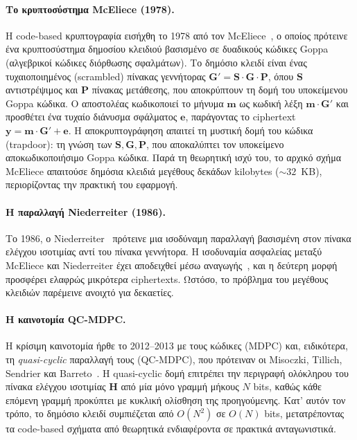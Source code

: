 \paragraph{Το κρυπτοσύστημα McEliece (1978).}
Η code-based κρυπτογραφία εισήχθη το 1978 από τον McEliece~\cite{McEliece1978},
ο οποίος πρότεινε ένα κρυπτοσύστημα δημοσίου κλειδιού βασισμένο σε δυαδικούς
κώδικες Goppa (αλγεβρικοί κώδικες διόρθωσης σφαλμάτων).
Το δημόσιο κλειδί είναι ένας τυχαιοποιημένος (scrambled) πίνακας γεννήτορας
$\mathbf{G}' = \mathbf{S}\cdot\mathbf{G}\cdot\mathbf{P}$, όπου $\mathbf{S}$ αντιστρέψιμος και
$\mathbf{P}$ πίνακας μετάθεσης, που αποκρύπτουν τη δομή του υποκείμενου Goppa κώδικα.
Ο αποστολέας κωδικοποιεί το μήνυμα $\mathbf{m}$ ως κωδική λέξη $\mathbf{m}\cdot\mathbf{G}'$
και προσθέτει ένα τυχαίο διάνυσμα σφάλματος $\mathbf{e}$,
παράγοντας το ciphertext $\mathbf{y} = \mathbf{m}\cdot\mathbf{G}' + \mathbf{e}$.
Η αποκρυπτογράφηση απαιτεί τη μυστική δομή του κώδικα (trapdoor): τη γνώση των $\mathbf{S}, \mathbf{G}, \mathbf{P}$, που αποκαλύπτει τον υποκείμενο αποκωδικοποιήσιμο Goppa κώδικα.
Παρά τη θεωρητική ισχύ του, το αρχικό σχήμα McEliece απαιτούσε δημόσια κλειδιά
μεγέθους δεκάδων kilobytes (${\sim}32$~KB), περιορίζοντας την πρακτική του εφαρμογή.

\paragraph{Η παραλλαγή Niederreiter (1986).}
Το 1986, ο Niederreiter~\cite{Niederreiter1986} πρότεινε μια ισοδύναμη παραλλαγή
βασισμένη στον πίνακα ελέγχου ισοτιμίας αντί του πίνακα γεννήτορα.
Η ισοδυναμία ασφαλείας μεταξύ McEliece και Niederreiter έχει αποδειχθεί μέσω
αναγωγής~\cite{LiDengWang1994}, και η δεύτερη μορφή προσφέρει ελαφρώς μικρότερα
ciphertexts.
Ωστόσο, το πρόβλημα του μεγέθους κλειδιών παρέμεινε ανοιχτό για δεκαετίες.

\paragraph{Η καινοτομία QC-MDPC.}
Η κρίσιμη καινοτομία ήρθε το 2012–2013 με τους κώδικες
 (MDPC) και, ειδικότερα, τη
\emph{quasi-cyclic} παραλλαγή τους (QC-MDPC), που πρότειναν οι Misoczki,
Tillich, Sendrier και Barreto~\cite{Misoczki2013-QCMDPC}.
Η quasi-cyclic δομή επιτρέπει την περιγραφή ολόκληρου του πίνακα ελέγχου
ισοτιμίας $\mathbf{H}$ από μία μόνο γραμμή μήκους $N$ bits, καθώς κάθε
επόμενη γραμμή προκύπτει με κυκλική ολίσθηση της προηγούμενης.
Κατ' αυτόν τον τρόπο, το δημόσιο κλειδί συμπιέζεται από $O(N^{2})$ σε
$O(N)$ bits, μετατρέποντας τα code-based σχήματα από θεωρητικά ενδιαφέροντα
σε πρακτικά ανταγωνιστικά.

